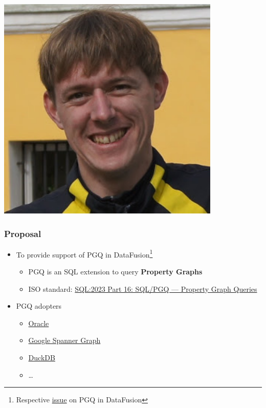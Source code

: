 \documentclass[xcolor=table,aspectratio=169]{beamer}
\begin{document}
\begin{frame}[fragile]
\begin{minipage}[t]{0.24\textwidth}
\begin{center}
\includegraphics[width=0.8\textwidth]{pictures/SemyonGrigorev.jpg}
  \end{center}
\end{minipage}
\end{frame}

\begin{frame}[fragile]
  \frametitle{Proposal}
  \begin{itemize}
    \item To provide support of PGQ in DataFusion\footnote{Respective \href{https://github.com/apache/datafusion/issues/13545}{issue} on PGQ in DataFusion}
    \begin{itemize}
      \item PGQ is an SQL extension to query \textbf{Property Graphs}
      \item ISO standard: \href{https://www.iso.org/standard/79473.html}{SQL:2023 Part 16: SQL/PGQ --- Property Graph Queries} 
    \end{itemize} 
    \item PGQ adopters
    \begin{itemize}
      \item \href{https://oracle-base.com/articles/23/sql-property-graphs-and-sql-pgq-23}{Oracle}
      \item \href{https://cloud.google.com/spanner/docs/graph/iso-standards}{Google Spanner Graph}
      \item \href{https://github.com/cwida/duckpgq-extension}{DuckDB}
      \item \ldots
    \end{itemize}
  \end{itemize}
\end{frame}
\end{document}
